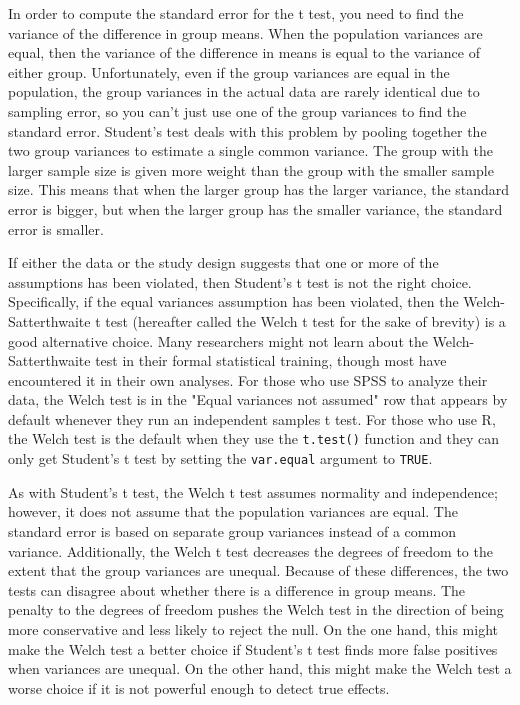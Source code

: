 \documentclass[man,a4paper,noextraspace,apacite]{apa6}\usepackage[]{graphicx}\usepackage[]{color}
\begin{document}
    In order to compute the standard error for the t test, you need to find the variance of the difference in group means. When the population variances are equal, then the variance of the difference in means is equal to the variance of either group. Unfortunately, even if the group variances are equal in the population, the group variances in the actual data are rarely identical due to sampling error, so you can't just use one of the group variances to find the standard error. Student's test deals with this problem by pooling together the two group variances to estimate a single common variance. The group with the larger sample size is given more weight than the group with the smaller sample size. This means that when the larger group has the larger variance, the standard error is bigger, but when the larger group has the smaller variance, the standard error is smaller.

    If either the data or the study design suggests that one or more of the assumptions has been violated, then Student's t test is not the right choice. Specifically, if the equal variances assumption has been violated, then the Welch-Satterthwaite t test (hereafter called the Welch t test for the sake of brevity) is a good alternative choice. Many researchers might not learn about the Welch-Satterthwaite test in their formal statistical training, though most have encountered it in their own analyses. For those who use SPSS to analyze their data, the Welch test is in the "Equal variances not assumed" row that appears by default whenever they run an independent samples t test. For those who use R, the Welch test is the default when they use the \texttt{t.test()} function and they can only get Student's t test by setting the \texttt{var.equal} argument to \texttt{TRUE}.
    
        As with Student's t test, the Welch t test assumes normality and independence; however, it does not assume that the population variances are equal. The standard error is based on separate group variances instead of a common variance. Additionally, the Welch t test decreases the degrees of freedom to the extent that the group variances are unequal. Because of these differences, the two tests can disagree about whether there is a difference in group means. The penalty to the degrees of freedom pushes the Welch test in the direction of being more conservative and less likely to reject the null. On the one hand, this might make the Welch test a better choice if Student's t test finds more false positives when variances are unequal. On the other hand, this might make the Welch test a worse choice if it is not powerful enough to detect true effects. 
        
\end{document}

